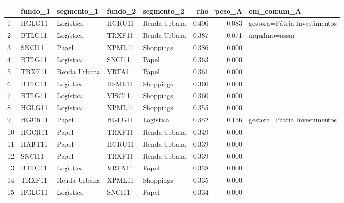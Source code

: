 \begin{tabular}{lllllrrl}
\toprule
 & fundo\_1 & segmento\_1 & fundo\_2 & segmento\_2 & rho & peso\_A & em\_comum\_A \\
\midrule
1 & HGLG11 & Logística & HGRU11 & Renda Urbana & 0.406 & 0.083 & gestora=Pátria Investimentos \\
2 & BTLG11 & Logística & TRXF11 & Renda Urbana & 0.387 & 0.071 & inquilino=assaí \\
3 & SNCI11 & Papel & XPML11 & Shoppings & 0.386 & 0.000 &  \\
4 & BTLG11 & Logística & SNCI11 & Papel & 0.363 & 0.000 &  \\
5 & TRXF11 & Renda Urbana & VRTA11 & Papel & 0.361 & 0.000 &  \\
6 & BTLG11 & Logística & HSML11 & Shoppings & 0.360 & 0.000 &  \\
7 & BTLG11 & Logística & VISC11 & Shoppings & 0.360 & 0.000 &  \\
8 & HGLG11 & Logística & XPML11 & Shoppings & 0.355 & 0.000 &  \\
9 & HGCR11 & Papel & HGLG11 & Logística & 0.352 & 0.156 & gestora=Pátria Investimentos \\
10 & HGCR11 & Papel & TRXF11 & Renda Urbana & 0.349 & 0.000 &  \\
11 & HABT11 & Papel & HGRU11 & Renda Urbana & 0.339 & 0.000 &  \\
12 & SNCI11 & Papel & TRXF11 & Renda Urbana & 0.339 & 0.000 &  \\
13 & BTLG11 & Logística & VRTA11 & Papel & 0.338 & 0.000 &  \\
14 & TRXF11 & Renda Urbana & XPML11 & Shoppings & 0.335 & 0.000 &  \\
15 & HGLG11 & Logística & SNCI11 & Papel & 0.334 & 0.000 &  \\
\bottomrule
\end{tabular}
